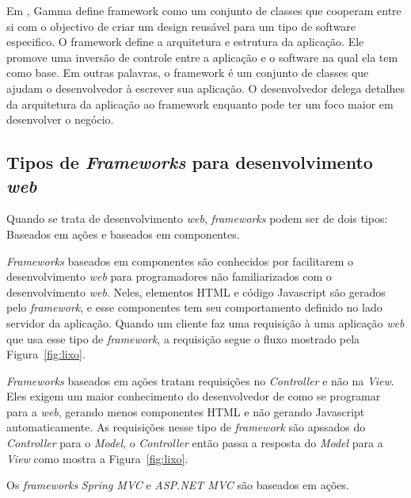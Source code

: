 Em \cite{28}, Gamma define framework como um conjunto de classes que cooperam entre si com o objectivo de criar um design reusável para um tipo de software especifico.
O framework define a arquitetura e estrutura da aplicação. Ele promove uma inversão de controle entre a aplicação e o software na qual ela tem como base. 
Em outras palavras, o framework é um conjunto de classes que ajudam o desenvolvedor à escrever sua aplicação. 
O desenvolvedor delega detalhes da arquitetura da aplicação ao framework enquanto pode ter um foco maior em desenvolver o negócio.

\subsection{Tipos de \textit{Frameworks} para desenvolvimento \textit{web}}

Quando se trata de desenvolvimento \textit{web}, \textit{frameworks} podem ser de dois tipos: Baseados em ações e baseados em componentes.

\textit{Frameworks} baseados em componentes são conhecidos por facilitarem o desenvolvimento \textit{web} para programadores não familiarizados com o desenvolvimento \textit{web}. 
Neles, elementos HTML e código Javascript são gerados pelo \textit{framework}, e esse componentes tem seu comportamento definido no lado servidor da aplicação.
Quando um cliente faz uma requisição à uma aplicação \textit{web} que usa esse tipo de \textit{framework}, a requisição segue o fluxo mostrado pela Figura~\ref{fig:lixo}.


\textit{Frameworks} baseados em ações tratam requisições no \textit{Controller} e não na \textit{View}. 
Eles exigem um maior conhecimento do desenvolvedor de como se programar para a \textit{web}, gerando menos componentes HTML e não gerando Javascript automaticamente. 
As requisições nesse tipo de \textit{framework} são apssados do \textit{Controller} para o \textit{Model}, o \textit{Controller} então passa a resposta do \textit{Model} para a \textit{View} como mostra a Figura~\ref{fig:lixo}.


Os \textit{frameworks} \textit{Spring MVC} e \textit{ASP.NET MVC} são baseados em ações.
